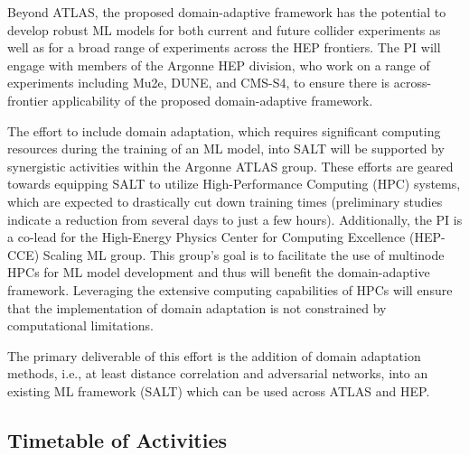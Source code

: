 \documentclass[letter, USenglish, 11pt, subfigure]{article}
\begin{document}
Beyond ATLAS, the proposed domain-adaptive framework has the potential to develop robust ML models for both current and future collider experiments as well as for a broad range of experiments across the HEP frontiers. The PI will engage with members of the Argonne HEP division, who work on a range of experiments including Mu2e, DUNE, and CMS-S4, to ensure there is across-frontier applicability of the proposed domain-adaptive framework.

The effort to include domain adaptation, which requires significant computing resources during the training of an ML model, into SALT will be supported by synergistic activities within the Argonne ATLAS group. These efforts are geared towards equipping SALT to utilize High-Performance Computing (HPC) systems, which are expected to drastically cut down training times (preliminary studies indicate a reduction from several days to just a few hours). Additionally, the PI is a co-lead for the High-Energy Physics Center for Computing Excellence (HEP-CCE) Scaling ML group. This group's goal is to facilitate the use of multinode HPCs for ML model development and thus will benefit the domain-adaptive framework. Leveraging the extensive computing capabilities of HPCs will ensure that the implementation of domain adaptation is not constrained by computational limitations.

The primary deliverable of this effort is the addition of domain adaptation methods, i.e., at least distance correlation and adversarial networks, into an existing ML framework (SALT) which can be used across ATLAS and HEP.
\clearpage
\subsection{Timetable of Activities}
\label{sec:timetable}
\end{document}
